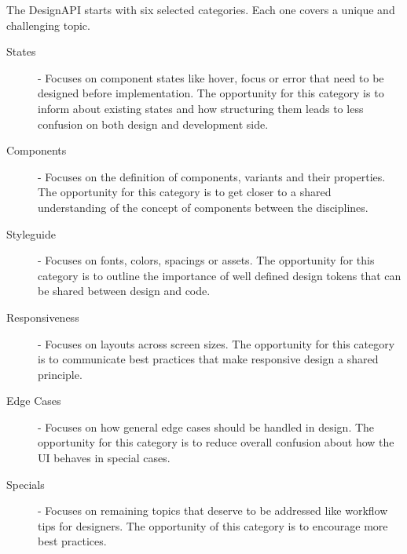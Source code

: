 %


The DesignAPI starts with six selected categories. Each one covers a unique and challenging topic.

\begin{description}
      \item[States] - Focuses on component states like hover, focus or error that need to be
            designed before implementation. The opportunity for this category is to inform about
            existing states and how structuring them leads to less confusion on both design and
            development side.

      \item[Components] - Focuses on the definition of components, variants and their properties.
            The opportunity for this category is to get closer to a shared understanding of the
            concept of components between the disciplines.

      \item[Styleguide] - Focuses on fonts, colors, spacings or assets. The opportunity for this
            category is to outline the importance of well defined design tokens that can be shared
            between design and code.

      \item[Responsiveness] - Focuses on layouts across screen sizes. The opportunity for this
            category is to communicate best practices that make responsive design a shared
            principle.

      \item[Edge Cases] - Focuses on how general edge cases should be handled in design. The
            opportunity for this category is to reduce overall confusion about how the UI behaves in
            special cases.

      \item[Specials] - Focuses on remaining topics that deserve to be addressed like workflow tips
            for designers. The opportunity of this category is to encourage more best practices.
\end{description}

